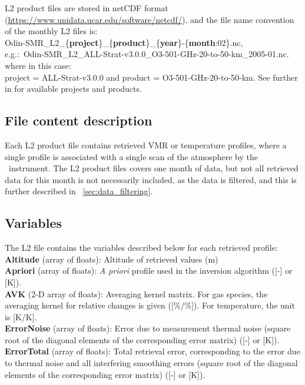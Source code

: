 L2 product files are stored in netCDF format
(\url{https://www.unidata.ucar.edu/software/netcdf/}),
and the file name convention of the monthly L2 files is: \\
Odin-SMR\_L2\_\{\textbf{project}\}\_\{\textbf{product}\}\_\{\textbf{year}\}-\{\textbf{month}:02\}.nc, \\
e.g.:\
Odin-SMR\_L2\_ALL-Strat-v3.0.0\_O3-501-GHz-20-to-50-km\_2005-01.nc.\\
where in this case:\\
project = ALL-Strat-v3.0.0 and product = O3-501-GHz-20-to-50-km.
See further in \cite{dds} for available projects and products.


\subsection{File content description}

Each L2 product file contains retrieved VMR or temperature profiles,
where a single profile is associated with a single scan of the atmosphere
by the \smr\ instrument.
The L2 product files covers one month of data, but not all retrieved data 
for this month is not necessarily included, as the data is filtered,
and this is further described in ~\ref{sec:data_filtering}.

\subsection*{Variables}

The L2 file contains the variables described below for each retrieved profile: \\

\textbf{Altitude} (array of floats): Altitude of retrieved values (m) \\

\textbf{Apriori} (array of floats): \textit{A priori} profile used in the inversion algorithm ([-] or [K]). \\

\textbf{AVK} (2-D array of floats): Averaging kernel matrix. For gas species, the averaging kernel for relative changes is given ([\%/\%]). For temperature, the unit is [K/K]. \\

\textbf{ErrorNoise} (array of floats): Error due to measurement thermal noise (square root of the diagonal elements of the corresponding error matrix) ([-] or [K]). \\

\textbf{ErrorTotal} (array of floats): Total retrieval error, corresponding to the error due to thermal noise and all interfering smoothing errors (square root of the diagonal elements of the corresponding error matrix) ([-] or [K]). \\

